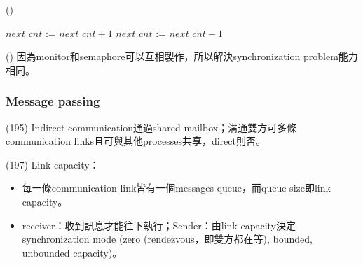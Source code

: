 \begin{theorem}{()}
\begin{itemize}
\begin{algorithm}[H]
            \caption{$x.signal()$.}
            \begin{algorithmic}[1]
                        \State $next\_cnt$ := $next\_cnt + 1$
                        \State {}
                        \State {} 
                        \State $next\_cnt$ := $next\_cnt - 1$ 
                    \EndIf
                \EndFunction
            \end{algorithmic}
        \end{algorithm}
    \end{itemize}
\end{theorem}

\begin{theorem}{()} 因為monitor和semaphore可以互相製作，所以解決synchronization problem能力相同。
\end{theorem}

\subsubsection{Message passing}

\begin{theorem}{(195)} Indirect communication通過shared mailbox；溝通雙方可多條communication links且可與其他processes共享，direct則否。
\end{theorem}

\begin{theorem}{(197)} Link capacity：\begin{itemize}
        \item 每一條communication link皆有一個messages queue，而queue size即link capacity。
        \item receiver：收到訊息才能往下執行；Sender：由link capacity決定synchronization mode (zero (rendezvous，即雙方都在等), bounded, unbounded capacity)。
    \end{itemize}
\end{theorem}
